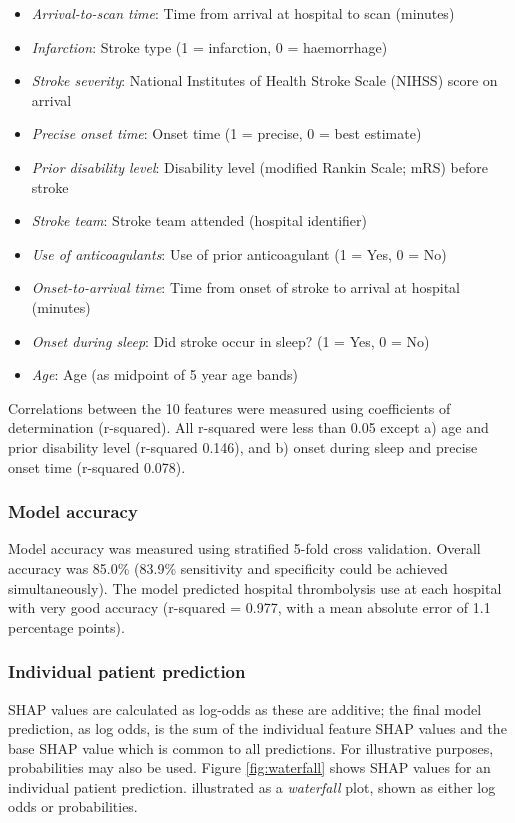 \begin{itemize}
    \item \emph{Arrival-to-scan time}: Time from arrival at hospital to scan (minutes)
    \item \emph{Infarction}: Stroke type (1 = infarction, 0 = haemorrhage)
    \item \emph{Stroke severity}: National Institutes of Health Stroke Scale (NIHSS) score on arrival
    \item \emph{Precise onset time}: Onset time (1 = precise, 0 = best estimate)
    \item \emph{Prior disability level}: Disability level (modified Rankin Scale; mRS) before stroke
    \item \emph{Stroke team}: Stroke team attended (hospital identifier)
    \item \emph{Use of anticoagulants}: Use of prior anticoagulant (1 = Yes, 0 = No)
    \item \emph{Onset-to-arrival time}: Time from onset of stroke to arrival at hospital (minutes)
    \item \emph{Onset during sleep}: Did stroke occur in sleep? (1 = Yes, 0 = No)
    \item \emph{Age}: Age (as midpoint of 5 year age bands)
\end{itemize}

Correlations between the 10 features were measured using coefficients of determination (r-squared). All r-squared were less than 0.05 except a) age and prior disability level (r-squared 0.146), and b) onset during sleep and precise onset time (r-squared 0.078).

\subsubsection{Model accuracy}

Model accuracy was measured using stratified 5-fold cross validation. Overall accuracy was 85.0\% (83.9\% sensitivity and specificity could be achieved simultaneously). The model predicted hospital thrombolysis use at each hospital with very good accuracy (r-squared = 0.977, with a mean absolute error of 1.1 percentage points).

\subsubsection{Individual patient prediction}

SHAP values are calculated as log-odds as these are additive; the final model prediction, as log odds, is the sum of the individual feature SHAP values and the base SHAP value which is common to all predictions. For illustrative purposes, probabilities may also be used. Figure \ref{fig:waterfall} shows SHAP values for an individual patient prediction. illustrated as a \textit{waterfall} plot, shown as either log odds or probabilities.


